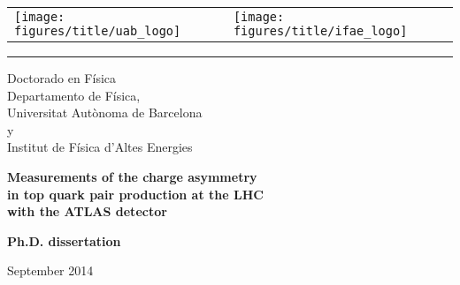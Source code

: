 \linespread{1.5}
\pagestyle{empty}
\begin{center}
\par
\vspace{6pt}
\begin{tabular}{p{5cm}p{5cm}}
\texttt{[image: figures/title/uab\_logo]}&
\texttt{[image: figures/title/ifae\_logo]}\\
\end{tabular}
\par
\vspace{6pt}
\hrule 
\par
\vspace{6pt}
\par
\begin{Large}
Doctorado en F\'isica\\
\vspace{-5pt}
Departamento de F\'isica,\\
\vspace{-10pt}
Universitat Aut\`onoma de Barcelona\\
\vspace{-10pt}
y\\
\vspace{-10pt}
Institut de F\'isica d'Altes Energies\\
\end{Large}
\vspace{80pt}
{\huge \bfseries Measurements of the charge asymmetry } \\
\vspace{6pt}
{\huge \bfseries in top quark pair production at the LHC } \\
\vspace{6pt}
{\huge \bfseries  with the ATLAS detector }
\vspace{40pt} \\

\begin{large}
\textbf{Ph.D. dissertation}
\par
\vspace{2pt}
\par
September 2014 \\ 
\par
\vspace{48pt}
\par
\end{large} 


\end{center}
